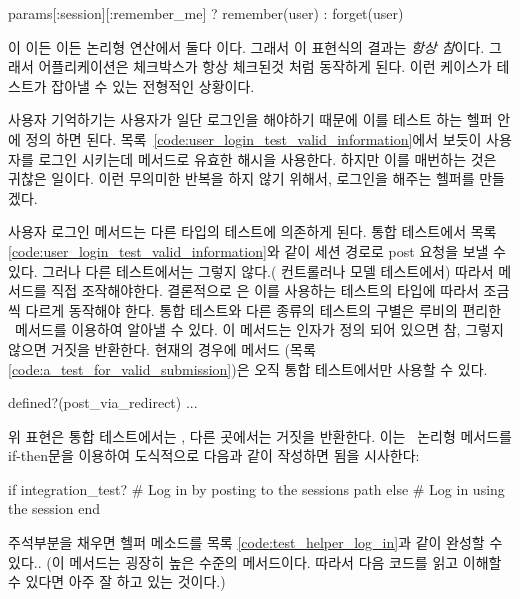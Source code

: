 {{%
\begin{code} params[:session][:remember_me] ? remember(user) : forget(user) \end{code} 

\noindent {}이  이든 이든 논리형 연산에서 둘다 이다. 그래서 이 표현식의 결과는 \emph{항상 참}이다. 그래서 어플리케이션은 체크박스가 항상 체크된것 처럼 동작하게 된다. 이런 케이스가 테스트가 잡아낼 수 있는 전형적인 상황이다. 

사용자 기억하기는 사용자가 일단 로그인을 해야하기 때문에 이를 테스트 하는 헬퍼 안에 정의 하면 된다. 목록~\ref{code:user_login_test_valid_information}에서 보듯이 사용자를 로그인 시키는데  메서드로 유효한  해시을 사용한다. 하지만 이를 매번하는 것은 귀찮은 일이다. 이런 무의미한 반복을 하지 않기 위해서, 로그인을 해주는  헬퍼를 만들겠다. 

사용자 로그인 메서드는 다른 타입의 테스트에 의존하게 된다. 통합 테스트에서 목록 \ref{code:user_login_test_valid_information}와 같이 세션 경로로 post 요청을 보낼 수 있다. 그러나 다른 테스트에서는 그렇지 않다.( 컨트롤러나 모델 테스트에서) 따라서  메서드를 직접 조작해야한다. 결론적으로 은 이를 사용하는 테스트의 타입에 따라서 조금씩 다르게 동작해야 한다. 통합 테스트와 다른 종류의 테스트의 구별은 루비의 편리한 \ 메서드를 이용하여 알아낼 수 있다. 이 메서드는 인자가 정의 되어 있으면 참, 그렇지 않으면 거짓을 반환한다. 현재의 경우에  메서드 (목록 \ref{code:a_test_for_valid_submission})은 오직 통합 테스트에서만 사용할 수 있다. 

\begin{code} defined?(post_via_redirect) ... \end{code} 

\noindent 위 표현은 통합 테스트에서는 , 다른 곳에서는 거짓을 반환한다. 이는 \ 논리형 메서드를 if-then문을 이용하여 도식적으로 다음과 같이 작성하면 됨을 시사한다: 

\begin{code} if integration_test? # Log in by posting to the sessions path else # Log in using the session end \end{code} 

\noindent 주석부분을 채우면  헬퍼 메소드를 목록 \ref{code:test_helper_log_in}과 같이 완성할 수 있다.. (이 메서드는 굉장히 높은 수준의 메서드이다. 따라서 다음 코드를 읽고 이해할 수 있다면 아주 잘 하고 있는 것이다.) 

}}
